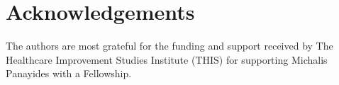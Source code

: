 \section*{Acknowledgements}

The authors are most grateful for the funding and support received by The 
Healthcare Improvement Studies Institute (THIS) for supporting Michalis 
Panayides with a Fellowship.